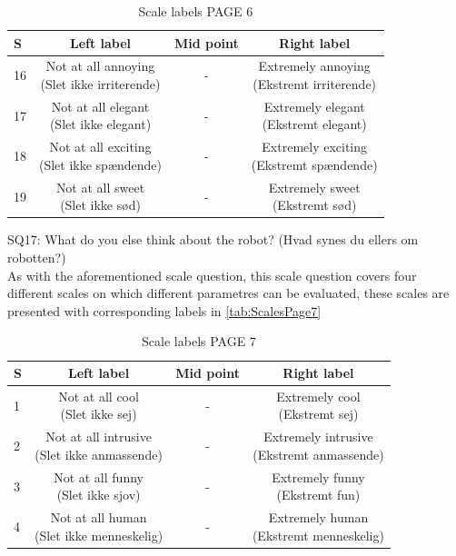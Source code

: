 \begin{table}[H]
	\centering
\caption{Scale labels PAGE 6}
	\label{tab:ScalesPage6} 
	\begin{tabular}{l|c|c|c}
		S     & Left label & Mid point & Right label \\\hline
		16   & \makecell{Not at all annoying\\(Slet ikke irriterende)}  & - & \makecell{Extremely annoying \\(Ekstremt irriterende)}        \\\hline
		17   & \makecell{Not at all elegant \\(Slet ikke elegant)} & - & \makecell{Extremely elegant \\(Ekstremt elegant)}         \\\hline
		18   & \makecell{Not at all exciting\\(Slet ikke spændende)} & - & \makecell{Extremely exciting \\(Ekstremt spændende)}         \\\hline
	 	19   & \makecell{Not at all sweet \\(Slet ikke sød)} & - & \makecell{Extremely sweet \\(Ekstremt sød)}               
	\end{tabular}        
\end{table}
\noindent
%
SQ17: What do you else think about the robot? (Hvad synes du ellers om robotten?)\\
As with the aforementioned scale question, this scale question covers four different scales on which different parametres can be evaluated, these scales are presented with corresponding labels in \autoref{tab:ScalesPage7}  
%
\begin{table}[H]
	\centering
\caption{Scale labels PAGE 7}
	\label{tab:ScalesPage7} 
	\begin{tabular}{l|c|c|c}
		S    & Left label & Mid point & Right label \\\hline
		1   & \makecell{Not at all cool\\(Slet ikke sej)}  & - & \makecell{Extremely cool \\(Ekstremt sej)}        \\\hline
		2   & \makecell{Not at all intrusive \\(Slet ikke anmassende)} & - & \makecell{Extremely intrusive \\(Ekstremt anmassende)}         \\\hline
		3   & \makecell{Not at all funny\\(Slet ikke sjov)} & - & \makecell{Extremely funny \\(Ekstremt fun)}         \\\hline
	 	4   & \makecell{Not at all human \\(Slet ikke menneskelig)} & - & \makecell{Extremely human \\(Ekstremt menneskelig)}               
	\end{tabular}        
\end{table}

